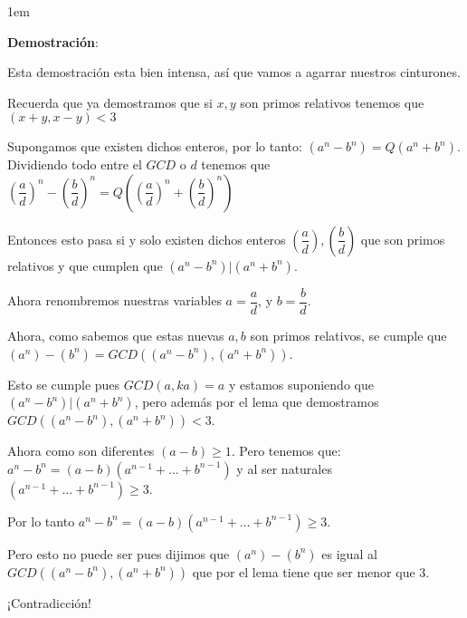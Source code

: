\documentclass[12pt, fleqn]{report}                             %
\newenvironment{SmallIndentation}[1][0.75em]                    %
    {\begin{adjustwidth}{#1}{}\begin{footnotesize}}                 %
    {\end{footnotesize}\end{adjustwidth}}                           %
\newcommand{\Wrap}[1]{\left( #1 \right)}                        %
\newcommand{\pfrac}[2]{\Wrap{\dfrac{#1}{#2}}}                   %
\begin{document}
\begin{itemize}
\begin{SmallIndentation}[1em]
                    \textbf{Demostración}:


                    Esta demostración esta bien intensa, así que vamos a agarrar nuestros
                    cinturones.

                    Recuerda que ya demostramos que si $x, y$ son primos relativos tenemos
                    que $(x+y, x-y) < 3$

                    Supongamos que existen dichos enteros, por lo tanto:
                    $(a^n-b^n) = Q(a^n+b^n)$.
                    Dividiendo todo entre el $GCD$ o $d$ tenemos que
                    $\pfrac{a}{d}^n-\pfrac{b}{d}^n = Q\Wrap{\pfrac{a}{d}^n+\pfrac{b}{d}^n}$
                    
                    Entonces esto pasa si y solo existen dichos enteros
                    $\pfrac{a}{d}, \pfrac{b}{d}$ que son primos relativos y que cumplen
                    que $(a^n-b^n)|(a^n+b^n)$.

                    Ahora renombremos nuestras variables $a = \dfrac{a}{d}$, y $b = \dfrac{b}{d}$.

                    Ahora, como sabemos que estas nuevas $a, b$ son primos relativos, se cumple que
                    $(a^n) -(b^n) = GCD\Wrap{(a^n -b^n),(a^n + b^n)}$.

                    Esto se cumple pues $GCD(a, ka) = a$ y estamos suponiendo que
                    $(a^n-b^n)|(a^n+b^n)$, pero además por el lema que demostramos
                    $GCD\Wrap{(a^n -b^n),(a^n + b^n)} < 3$.

                    Ahora como son diferentes $(a-b)\geq 1$. Pero tenemos que:
                    $a^n-b^n = (a-b)(a^{n-1} + \dots + b^{n-1})$
                    y al ser naturales $(a^{n-1} + \dots + b^{n-1}) \geq 3$.

                    Por lo tanto $a^n-b^n = (a-b)(a^{n-1} + \dots + b^{n-1}) \geq 3$.

                    Pero esto no puede ser pues dijimos que
                    $(a^n) -(b^n)$ es igual al $GCD\Wrap{(a^n -b^n),(a^n + b^n)}$ que por el
                    lema tiene que ser menor que 3.

                    ¡Contradicción!

                \end{SmallIndentation}

            \end{itemize}
\end{document}
